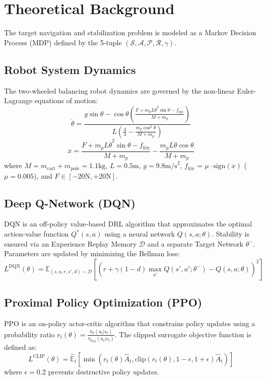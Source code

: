 \documentclass[journal,twocolumn]{IEEEtran}
\begin{document}
\section{Theoretical Background}
The target navigation and stabilization problem is modeled as a Markov Decision Process (MDP) defined by the 5-tuple $(\mathcal{S}, \mathcal{A}, \mathcal{P}, \mathcal{R}, \gamma)$.

\subsection{Robot System Dynamics}
The two-wheeled balancing robot dynamics are governed by the non-linear Euler-Lagrange equations of motion:
\begin{equation}
\ddot{\theta} = \frac{g \sin\theta - \cos\theta \left( \frac{F + m_p L \dot{\theta}^2 \sin\theta - f_{\text{fric}}}{M + m_p} \right)}{L \left( \frac{4}{3} - \frac{m_p \cos^2\theta}{M + m_p} \right)}
\end{equation}
\begin{equation}
\ddot{x} = \frac{F + m_p L \dot{\theta}^2 \sin\theta - f_{\text{fric}}}{M + m_p} - \frac{m_p L \ddot{\theta} \cos\theta}{M + m_p}
\end{equation}
where $M = m_{\text{cart}} + m_{\text{pole}} = 1.1\text{kg}$, $L = 0.5\text{m}$, $g = 9.8\text{m/s}^2$, $f_{\text{fric}} = \mu \cdot \text{sign}(\dot{x})$ ($\mu = 0.005$), and $F \in [-20\text{N}, +20\text{N}]$.

\subsection{Deep Q-Network (DQN)}
DQN is an off-policy value-based DRL algorithm that approximates the optimal action-value function $Q^*(s, a)$ using a neural network $Q(s, a; \theta)$. Stability is ensured via an Experience Replay Memory $\mathcal{D}$ and a separate Target Network $\theta^-$. Parameters are updated by minimizing the Bellman loss:
\begin{equation}
L^{\text{DQN}}(\theta) = \mathbb{E}_{(s,a,r,s',d) \sim \mathcal{D}} \left[ \left( r + \gamma(1-d)\max_{a'} Q(s',a';\theta^-) - Q(s,a;\theta) \right)^2 \right]
\end{equation}

\subsection{Proximal Policy Optimization (PPO)}
PPO is an on-policy actor-critic algorithm that constrains policy updates using a probability ratio $r_t(\theta) = \frac{\pi_\theta(a_t|s_t)}{\pi_{\theta_{\text{old}}}(a_t|s_t)}$. The clipped surrogate objective function is defined as:
\begin{equation}
L^{\text{CLIP}}(\theta) = \hat{\mathbb{E}}_t \left[ \min\left( r_t(\theta)\hat{A}_t, \text{clip}(r_t(\theta), 1-\epsilon, 1+\epsilon)\hat{A}_t \right) \right]
\end{equation}
where $\epsilon = 0.2$ prevents destructive policy updates.
\end{document}
